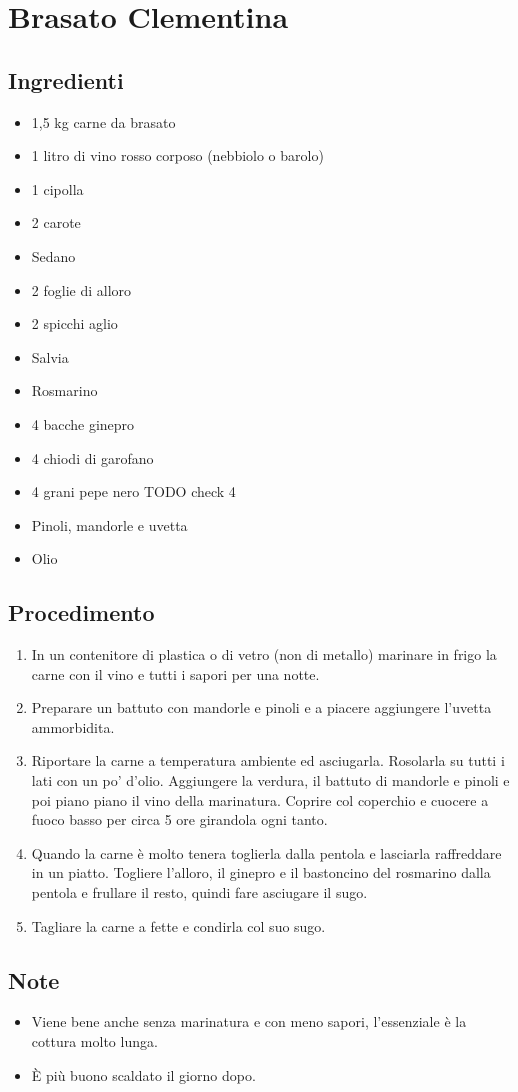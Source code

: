 \section{Brasato Clementina}
\subsection{Ingredienti}
\begin{itemize}
\item 1,5 kg carne da brasato  
\item 1 litro di vino rosso corposo (nebbiolo o barolo)  
\item 1 cipolla  
\item 2 carote  
\item Sedano  
\item 2 foglie di alloro  
\item 2 spicchi aglio  
\item Salvia  
\item Rosmarino  
\item 4 bacche ginepro
\item 4 chiodi di garofano
\item 4 grani pepe nero  TODO check 4
\item Pinoli, mandorle e uvetta  
\item Olio
\end{itemize}
\subsection{Procedimento}
\begin{enumerate}
\item  In un contenitore di plastica o di vetro (non di metallo) marinare in frigo la carne con il vino e tutti i sapori per una notte.  
\item  Preparare un battuto con mandorle e pinoli e a piacere aggiungere l'uvetta ammorbidita.  
\item  Riportare la carne a temperatura ambiente ed asciugarla. Rosolarla su tutti i lati con un po' d'olio. Aggiungere la verdura, il battuto di mandorle e pinoli e poi piano piano il vino della marinatura. Coprire col coperchio e cuocere a fuoco basso per circa 5 ore girandola ogni tanto.  
\item  Quando la carne è molto tenera toglierla dalla pentola e lasciarla raffreddare in un piatto. Togliere l'alloro, il ginepro e il bastoncino del rosmarino dalla pentola e frullare il resto, quindi fare asciugare il sugo.   
\item  Tagliare la carne a fette e condirla col suo sugo.
\end{enumerate}
\subsection{Note}
\begin{itemize}
\item Viene bene anche senza marinatura e con meno sapori, l'essenziale è la cottura molto lunga.  
\item È più buono scaldato il giorno dopo.
\end{itemize}
